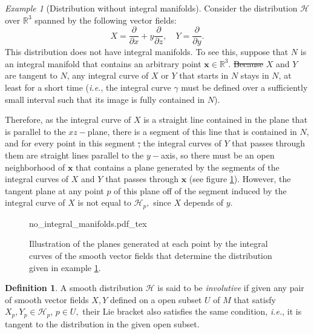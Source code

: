 \documentclass[12pt, letterpaper, reqno]{amsart}
\newcommand{\incfig}[2][1]{%
    \def\svgwidth{#1\columnwidth}
    {#2.pdf_tex}
}
\theoremstyle{definition}
\newtheorem{df}{Definition}
\theoremstyle{plain}
\theoremstyle{remark}
\newtheorem{ex}{Example}
\providecommand{\DIFadd}[1]{{\protect\color{blue}\uwave{#1}}} %
\providecommand{\DIFdel}[1]{{\protect\color{red}\sout{#1}}}                      %
\providecommand{\DIFaddbegin}{} %
\providecommand{\DIFaddend}{} %
\providecommand{\DIFdelbegin}{} %
\providecommand{\DIFdelend}{} %
\newcommand{\DIFscaledelfig}{0.5}
\newlength{\DIFdelgraphicswidth} %
\newlength{\DIFdelgraphicsheight} %
\newcommand{\DIFaddincludegraphics}[2][]{{\color{blue}\fbox{\DIFOincludegraphics[#1]{#2}}}} %
\newcommand{\DIFdelincludegraphics}[2][]{%
\sbox{\DIFdelgraphicsbox}{\DIFOincludegraphics[#1]{#2}}%
\settoboxwidth{\DIFdelgraphicswidth}{\DIFdelgraphicsbox} %
\settoboxtotalheight{\DIFdelgraphicsheight}{\DIFdelgraphicsbox} %
\scalebox{\DIFscaledelfig}{%
\parbox[b]{\DIFdelgraphicswidth}{\usebox{\DIFdelgraphicsbox}\\[-\baselineskip] \rule{\DIFdelgraphicswidth}{0em}}\llap{\resizebox{\DIFdelgraphicswidth}{\DIFdelgraphicsheight}{%
\setlength{\unitlength}{\DIFdelgraphicswidth}%
\begin{picture}(1,1)%
\thicklines\linethickness{2pt} %
{\color[rgb]{1,0,0}\put(0,0){\framebox(1,1){}}}%
{\color[rgb]{1,0,0}\put(0,0){\line( 1,1){1}}}%
{\color[rgb]{1,0,0}\put(0,1){\line(1,-1){1}}}%
\end{picture}%
}\hspace*{3pt}}} %
} %
\DeclareRobustCommand{\DIFaddbegin}{\DIFOaddbegin \let\includegraphics\DIFaddincludegraphics} %
\DeclareRobustCommand{\DIFaddend}{\DIFOaddend \let\includegraphics\DIFOincludegraphics} %
\DeclareRobustCommand{\DIFdelbegin}{\DIFOdelbegin \let\includegraphics\DIFdelincludegraphics} %
\DeclareRobustCommand{\DIFdelend}{\DIFOaddend \let\includegraphics\DIFOincludegraphics} %
\begin{document}
\begin{ex}[Distribution without integral manifolds] \label{ex:no_integral_manifolds}
	Consider the distribution $ \mathcal{H} $ over $ \mathbb{R}^3 $ spanned by the following vector fields: 
	$$ X = \frac{\partial}{\partial x} + y \frac{\partial}{\partial z}, \quad Y = \frac{\partial}{\partial y}.  $$ 
	This distribution does not have integral manifolds. To see this, suppose that $ N $ is an integral manifold that contains an arbitrary point $ \textbf{x} \in \mathbb{R}^3.  $ \DIFdelbegin \DIFdel{Because }\DIFdelend \DIFaddbegin \DIFadd{As }\DIFaddend $ X $ and $ Y $ are tangent to $ N $, any integral curve of $ X $ or $ Y $ that starts in $ N $ stays in $ N $, at least for a short time (\textit{i.e.}, the integral curve $ \gamma $ must be defined over a sufficiently small interval such that its image is fully contained in $ N $).   

	Therefore, as the integral curve of $ X $ is a straight line contained in the plane that is parallel to the $ xz- $plane, there is a segment of this line that is contained in $ N $, and for every point in this segment \DIFdelbegin \DIFdel{, }\DIFdelend the integral curves of $ Y $ that passes through them are straight lines parallel to the $ y- $axis, so there must be an open neighborhood of $ \textbf{x}  $ that contains a plane generated by the segments of the integral curves of $ X $ and $ Y $ that passes through $ \textbf{x}$ (see figure \ref{fig:no_integral_manifolds}). However, the tangent plane at any point $ p $  of this plane  off of the segment induced by the integral curve of $ X $ is not equal to $ \mathcal{H}_p, $ since $ X $ depends of $ y $.   
\end{ex}

\begin{figure}
    \centering
    \incfig{no_integral_manifolds}
    \caption{Illustration of the planes generated at each point by the integral curves of the smooth vector fields that determine the distribution given in example \ref{ex:no_integral_manifolds}.}
    \label{fig:no_integral_manifolds}
\end{figure}

\begin{df}

A smooth distribution $ \mathcal{H} $ is said to be \textit{involutive} if given any pair of smooth vector fields $ X,Y $ defined on a open subset $ U $  of $ M $  that satisfy $X_p,Y_p\in \mathcal{H}_p $, $ p\in U, $ their Lie bracket also satisfies the same condition, \textit{i.e.}, it is tangent to the distribution in the given open subset. 
\end{df}
\end{document}
